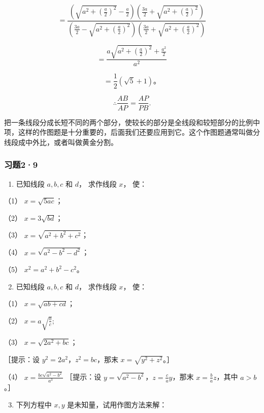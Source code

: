 \[
= \frac {\left(\sqrt {a ^ {2} + \left(\frac {a}{2}\right) ^ {2}} - \frac {a}{2}\right) \left(\frac {3 a}{2} + \sqrt {a ^ {2} + \left(\frac {a}{2}\right) ^ {2}}\right)}{\left(\frac {3 a}{2} - \sqrt {a ^ {2} + \left(\frac {a}{2}\right) ^ {2}}\right) \left(\frac {3 a}{2} + \sqrt {a ^ {2} + \left(\frac {a}{2}\right) ^ {2}}\right)}
\]

\[
= \frac {a \sqrt {a ^ {2} + \left(\frac {a}{2}\right) ^ {2}} + \frac {a ^ {2}}{2}}{a ^ {2}}
\]

\[
= \frac {1}{2} (\sqrt {5} + 1)\text{。}
\]

\[
\therefore \frac {A B}{A P} = \frac {A P}{P B}.
\]

把一条线段分成长短不同的两个部分，使较长的部分是全线段和较短部分的比例中项，这样的作图题是十分重要的，后面我们还要应用到它。这个作图题通常叫做分线段成中外比，或者叫做黄金分割。

\subsubsection{习题2·9}

\begin{enumerate}
\item
  已知线段 \(a, b, c\) 和 \(d\)， 求作线段 \(x\)， 使：
\end{enumerate}

（1） \(x = \sqrt{5ac}\)；

（2） \(x = 3\sqrt{bd}\)；

（3） \(x = \sqrt{a^2 + b^2 + c^2}\)；

（4） \(x = \sqrt{a^2 - b^2 - d^2}\)；

（5） \(x^{2} = a^{2} + b^{2} - c^{2}\)。

\begin{enumerate}
\setcounter{enumi}{1}
\item
  已知线段 \(a, b, c\) 和 \(d\)， 求作线段 \(x\)， 使：
\end{enumerate}

（1） \(x = \sqrt{ab + cd}\)；

（2） \(x = a\sqrt{\frac{b}{c}};\)

（3） \(x = \sqrt{2a^2 + bc}\)；

［提示：设 \(y^{2} = 2a^{2}\)，\(z^{2} = bc\)，那末
\(x = \sqrt{y^{2} + z^{2}}\)。］

（4） \(x = \frac{bc\sqrt{a^2 - b^2}}{a^3}\) ［提示：设
\(y = \sqrt{a^2 - b^2}\)，\(z = \frac{c}{a}y\)，那末
\(x = \frac{b}{a}z\)，其中 \(a > b\)。］

\begin{enumerate}
\setcounter{enumi}{2}
\item
  下列方程中 \(x, y\) 是未知量，试用作图方法来解：
\end{enumerate}

